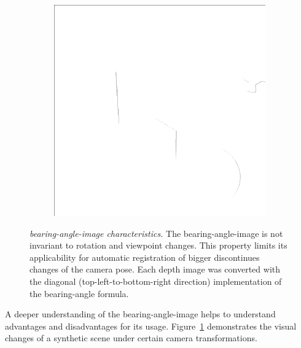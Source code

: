 \begin{figure}[H]
\begin{subfigure}[t]{0.32\textwidth}
    \end{subfigure}
    \begin{subfigure}[t]{0.32\textwidth}
        \includegraphics[width=\linewidth]{chapter04/img/bearing-diag-0210.png}
    \end{subfigure}
    \caption[\gls{bearing-angle-image} characteristics]{\emph{\gls{bearing-angle-image} characteristics.} The \gls{bearing-angle-image} is not invariant to rotation and viewpoint changes. This property limits its applicability for automatic registration of bigger discontinues changes of the camera pose. Each depth image was converted with the diagonal (top-left-to-bottom-right direction) implementation of the \gls{bearing-angle} formula.}\label{fig:bearing_characteristics}
\end{figure}
A deeper understanding of the \gls{bearing-angle-image} helps to understand advantages and disadvantages for its usage.
Figure~\ref{fig:bearing_characteristics} demonstrates the visual changes of a synthetic scene under certain camera transformations.

